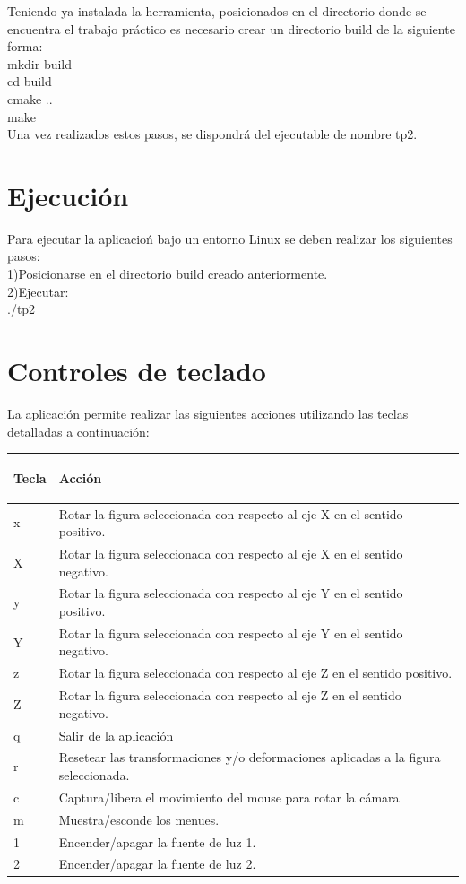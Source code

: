 \documentclass[11pt]{article}
\begin{document}
Teniendo ya instalada la herramienta, posicionados en el directorio donde se encuentra el trabajo pr\'actico es necesario crear un directorio build
de la siguiente forma: \\
mkdir build \\
cd build \\
cmake .. \\
make \\

Una vez realizados estos pasos, se dispondr\'a del ejecutable de nombre tp2.

\section{Ejecuci\'on}

Para ejecutar la aplicacio\'n bajo un entorno Linux se deben realizar los siguientes pasos: \\
1)Posicionarse en el directorio build creado anteriormente. \\
2)Ejecutar: \\
./tp2 

\newpage
\section{Controles de teclado}

La aplicaci\'on permite realizar las siguientes acciones utilizando las teclas detalladas a continuaci\'on: \\


    \begin{tabular}{|| l | l ||}
      \hline
      \begin{large}Tecla\end{large} & 
	\begin{large}Acci\'{o}n \end{large} \\
          \hline
x & Rotar la figura seleccionada con respecto al eje X en el sentido positivo. \\
X & Rotar la figura seleccionada con respecto al eje X en el sentido negativo. \\
y & Rotar la figura seleccionada con respecto al eje Y en el sentido positivo. \\
Y & Rotar la figura seleccionada con respecto al eje Y en el sentido negativo. \\
z & Rotar la figura seleccionada con respecto al eje Z en el sentido positivo. \\
Z & Rotar la figura seleccionada con respecto al eje Z en el sentido negativo.  \\
q & Salir de la aplicaci\'on  \\
r & Resetear las transformaciones y/o deformaciones aplicadas a la figura seleccionada.  \\
c & Captura/libera el movimiento del mouse para rotar la c\'amara  \\
m & Muestra/esconde los menues.  \\
1 & Encender/apagar la fuente de luz 1.  \\
2 & Encender/apagar la fuente de luz 2.  \\

          \hline
    \end{tabular}
  
\end{document}
